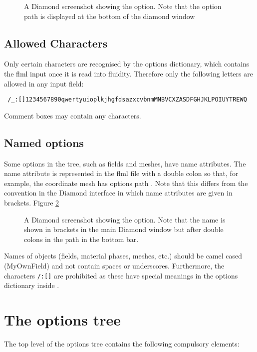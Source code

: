 \begin{figure}[ht]
  \centering
  \caption{A Diamond screenshot showing the 
    option. Note that the option path is displayed at the bottom of the
    diamond window}
  \label{fig:geometry_dimension}
\end{figure}

\subsection{Allowed Characters}
Only certain characters are recognised by the options dictionary, which contains the flml input once it is read into fluidity. Therefore only the following letters are allowed in any input field:

\begin{verbatim}
 /_:[]1234567890qwertyuioplkjhgfdsazxcvbnmMNBVCXZASDFGHJKLPOIUYTREWQ
\end{verbatim}

Comment boxes may contain any characters. 

\subsection{Named options}
Some options in the tree, such as fields and meshes, have name
attributes. The name attribute is represented in the flml file with a double colon so that,
for example, the coordinate mesh has options path\onlypdf\linebreak
{}. Note that this differs from the
convention in the Diamond interface in which name attributes are given in brackets. Figure
\ref{fig:mesh_name}

\begin{figure}[ht]
  \centering
  \caption{A Diamond screenshot showing the 
    option. Note that the name is shown in brackets in the main Diamond
    window but after double colons in the path in the bottom bar.}
  \label{fig:mesh_name}
\end{figure}

Names of objects (fields, material phases, meshes, etc.) should be camel cased (MyOwnField) and not contain spaces or underscores. Furthermore, the characters \verb+/:[]+ are prohibited as these have special meanings in the options dictionary inside \fluidity. 

\section{The options tree}\label{sec:OptionsTree}
The top level of the options tree contains the following compulsory elements:

